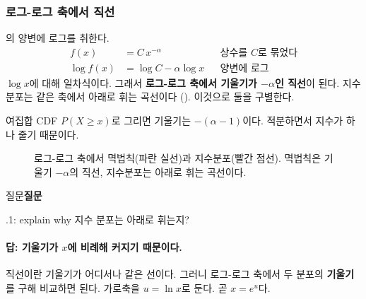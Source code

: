 \documentclass[11pt]{article}
\newenvironment{callout}[1][]
  {\par\medskip\noindent
   \begin{lrbox}{\calloutbox}\begin{minipage}{0.92\linewidth}
   \def\calloutttl{#1}\ifx\calloutttl\empty\else\textbf{#1}\par\smallskip\fi}
  {\end{minipage}\end{lrbox}%
   \fcolorbox{black!30}{black!3}{\usebox{\calloutbox}}\par\medskip}
\newcommand{\term}[1]{\textbf{#1}}
\begin{document}
\subsubsection{로그-로그 축에서 직선}
\label{sec:loglog}
의 양변에 로그를 취한다.
\begin{align*}
  f(x) &= C\,x^{-\alpha}
       && \text{상수를 $C$로 묶었다}\\
  \log f(x) &= \log C - \alpha \log x
       && \text{양변에 로그}
\end{align*}
$\log x$에 대해 일차식이다. 그래서 \term{로그-로그 축에서 기울기가
$-\alpha$인 직선}이 된다. 지수분포는 같은 축에서 아래로 휘는 곡선이다
(). 이것으로 둘을 구별한다.

여집합 CDF $P(X \ge x)$로 그리면 기울기는 $-(\alpha - 1)$이다. 적분하면서
지수가 하나 줄기 때문이다.

\begin{figure}[H]
  \centering
  \caption{로그-로그 축에서 멱법칙(파란 실선)과 지수분포(빨간 점선).
  멱법칙은 기울기 $-\alpha$의 직선, 지수분포는 아래로 휘는 곡선이다.}
  \label{fig:loglog}
\end{figure}

\begin{callout}[질문]
2.1.1: explain why 지수 분포는 아래로 휘는지?
\end{callout}

\paragraph{답: 기울기가 $x$에 비례해 커지기 때문이다.}
직선이란 기울기가 어디서나 같은 선이다. 그러니 로그-로그 축에서 두 분포의
\term{기울기}를 구해 비교하면 된다. 가로축을 $u = \ln x$로 둔다. 곧 $x = e^u$다.
\end{document}
